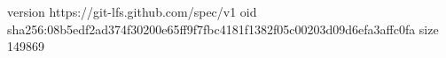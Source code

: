 version https://git-lfs.github.com/spec/v1
oid sha256:08b5edf2ad374f30200e65ff9f7fbc4181f1382f05c00203d09d6efa3affc0fa
size 149869
